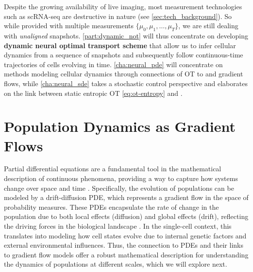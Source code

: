 Despite the growing availability of live imaging, most measurement technologies such as \acrshort{sc}\acrshort{RNA-seq} are destructive in nature (see \cref{sec:tech_background}).
So while provided with multiple measurements $\{ \mu_0, \mu_1, \dots, \mu_T \}$, we are still dealing with \emph{unaligned} snapshots.
\cref{part:dynamic_not} will thus concentrate on developing \textbf{dynamic neural optimal transport scheme} that allow us to infer cellular dynamics from a sequence of snapshots and subsequently follow continuous-time trajectories of cells evolving in time.
\cref{cha:neural_pde} will concentrate on methods modeling cellular dynamics through connections of \acrlong{OT} to  and gradient flows, while \cref{cha:neural_sde} takes a stochastic control perspective and elaborates on the link between static entropic OT \eqref{eq:ot-entropy} and .


\section{Population Dynamics as Gradient Flows}

Partial differential equations are a fundamental tool in the mathematical description of continuous phenomena, providing a way to capture how systems change over space and time \citep{risken1996fokker}. 
Specifically, the evolution of populations can be modeled by a drift-diffusion PDE, which represents a gradient flow in the space of probability measures.
These PDEs encapsulate the rate of change in the population due to both local effects (diffusion) and global effects (drift), reflecting the driving forces in the biological landscape \citep{teschendorff2021statistical, weinreb2018fundamental}.
In the single-cell context, this translates into modeling how cell states evolve due to internal genetic factors and external environmental influences. Thus, the connection to PDEs and their links to gradient flow models offer a robust mathematical description for understanding the dynamics of populations at different scales, which we will explore next.

